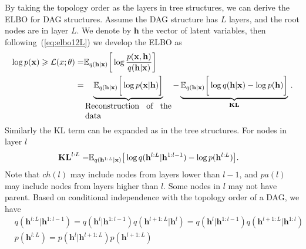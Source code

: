 \documentclass{article}
\begin{document}
By taking the topology order as the layers in tree structures, we can derive the ELBO for DAG structures.  
Assume the DAG structure has $L$ layers, and the root nodes are in layer $L$. 
We denote by $\mathbf{h}$ the vector of latent variables, then following~(\ref{eq:elbo12L}) we develop the ELBO as
\begin{align}  \label{eq:dag_elbo}
\log p(\mathbf{x})  \geqslant  \mathcal{L}(x;\theta)  = &  \mathbb{E}_{q(\mathbf{h} | \mathbf{x})} \bigg[ \log  \frac{p(\mathbf{x}, \mathbf{h})}{q(\mathbf{h}|\mathbf{x})}  \bigg]  \\ \notag
=&  \underbrace{ \mathbb{E}_{q(\mathbf{h} | \mathbf{x})} \bigg[ \log  p(\mathbf{x} |\mathbf{h})  \bigg] }_{  \parbox{10.5em}{Reconstruction of the data}}  -  \underbrace{  \mathbb{E}_{q(\mathbf{h}| \mathbf{x})} \bigg[  \log q(\mathbf{h}|\mathbf{x}) - \log p( \mathbf{h}) \bigg] }_{\textbf{\text{KL}}} \, .   \notag
\end{align} %
Similarly the KL term can be expanded as in the tree structures. 
For nodes in layer $l$
\begin{align*} 
\textbf{\text{KL}}^{l:L} 
= &\mathbb{E}_{q(\mathbf{h}^{1:L}|\mathbf{x})}\big[  \log q(\mathbf{h}^{l:L}|\mathbf{h}^{1:l-1})- \log p(\mathbf{h}^{l:L})  \big].
\end{align*} 
Note that $ch(l)$ may include nodes from layers lower than $l-1$, and $pa(l)$ may include nodes from layers higher than $l$.
Some nodes in $l$ may not have parent. Based on conditional independence with the topology order of a DAG, we have 
\begin{align} \label{eq:dag_chain_q}
&q(\mathbf{h}^{l:L}|\mathbf{h}^{1:l-1})=q(\mathbf{h}^{l}|\mathbf{h}^{1:l-1})q(\mathbf{h}^{l+1:L}|\mathbf{h}^{l})=q(\mathbf{h}^{l}|\mathbf{h}^{1:l-1})q(\mathbf{h}^{l+1:L}|\mathbf{h}^{1:l})\\ \label{eq:dag_chain_p}
&p(\mathbf{h}^{l:L}) =p(\mathbf{h}^{l}|\mathbf{h}^{l+1:L})p(\mathbf{h}^{l+1:L})%
\end{align}
\end{document}
